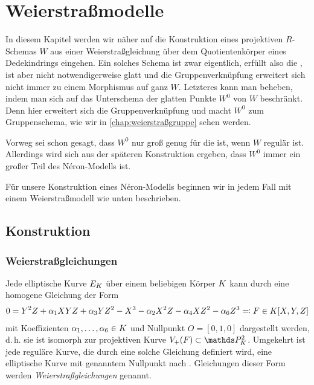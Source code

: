 \documentclass[german, bibliography=totoc]{scrreprt}
\begin{document}




\chapter{Weierstraßmodelle}\label{chap:weierstraßmodelle}
In diesem Kapitel werden wir näher auf die Konstruktion eines
projektiven $R$-Schemas $W$ aus einer Weierstraßgleichung über dem
Quotientenkörper eines Dedekindrings eingehen.
Ein solches Schema ist zwar eigentlich, erfüllt also die \NAbbEig, ist
aber nicht notwendigerweise glatt und die Gruppenverknüpfung
erweitert sich nicht immer zu einem Morphismus auf ganz $W$.
Letzteres kann man beheben, indem man sich auf das Unterschema der
glatten Punkte $W^0$ von $W$ beschränkt. Denn hier erweitert sich die
Gruppenverknüpfung und macht $W^0$ zum Gruppenschema, wie wir in
\autoref{chap:weierstraßgruppe} sehen werden.

Vorweg sei schon gesagt, dass $W^0$ nur groß genug für die
\NAbbEig ist, wenn $W$ regulär ist. Allerdings wird sich aus
der späteren Konstruktion ergeben, dass $W^0$ immer ein großer Teil
des Néron-Modells ist.

Für unsere Konstruktion eines Néron-Modells beginnen wir in jedem Fall
mit einem Weierstraßmodell wie unten beschrieben.

\section{Konstruktion}
\subsection{Weierstraßgleichungen}
Jede elliptische Kurve $E_{K}$ über einem beliebigen Körper $K$ kann
durch eine homogene Gleichung der Form
\begin{gather*}
  0 = Y^2 Z + \alpha_1 XYZ + \alpha_3 YZ^2 - X^3 - \alpha_2X^2 Z - \alpha_4 XZ^2 - \alpha_6 Z^3
  \eqqcolon F\in K[X,Y,Z]
\end{gather*}
mit Koeffizienten $\alpha_1,\dotsc,\alpha_6\in K$ und Nullpunkt $O=[0,1,0]$
dargestellt werden, d.\,h. sie ist isomorph zur projektiven Kurve
$V_+(F)\subset\P_\K^2$.
Umgekehrt ist jede reguläre Kurve, die durch eine
solche Gleichung definiert wird, eine elliptische Kurve mit genanntem
Nullpunkt nach \cite[Proposition III.3.1]{silverman}.
Gleichungen dieser Form werden \emph{Weierstraßgleichungen} genannt.
\end{document}
